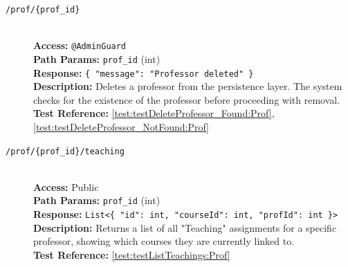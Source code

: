 \begin{description}
	\item[\DELETE \quad \texttt{/prof/\{prof\_id\}}] \hfill \\
	\textbf{Access:} \texttt{@AdminGuard} \\
	\textbf{Path Params:} \texttt{prof\_id} (int) \\
	\textbf{Response:} \texttt{\{ "message": "Professor deleted" \}} \\
	\textbf{Description:} Deletes a professor from the persistence layer. The system checks for the existence of the professor before proceeding with removal.\\
	\textbf{Test Reference:} \ref{test:testDeleteProfessor_Found:Prof}, \ref{test:testDeleteProfessor_NotFound:Prof}
	
	\item[\GET \quad \texttt{/prof/\{prof\_id\}/teaching}] \hfill \\
	\textbf{Access:} Public \\
	\textbf{Path Params:} \texttt{prof\_id} (int) \\
	\textbf{Response:} \texttt{List<\{ "id": int, "courseId": int, "profId": int \}>} \\
	\textbf{Description:} Returns a list of all "Teaching" assignments for a specific professor, showing which courses they are currently linked to.\\
	\textbf{Test Reference:} \ref{test:testListTeachings:Prof}
\end{description}

